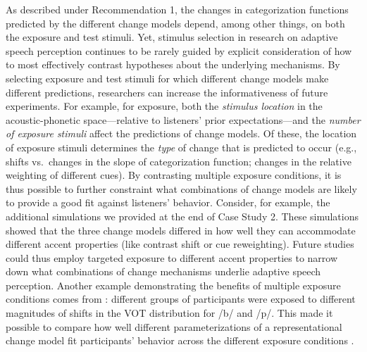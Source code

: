 \documentclass[
  11pt,
  man,floatsintext]{apa6}
\begin{document}
As described under Recommendation 1, the changes in categorization functions predicted by the different change models depend, among other things, on both the exposure and test stimuli. Yet, stimulus selection in research on adaptive speech perception continues to be rarely guided by explicit consideration of how to most effectively contrast hypotheses about the underlying mechanisms. By selecting exposure and test stimuli for which different change models make different predictions, researchers can increase the informativeness of future experiments. For example, for exposure, both the \emph{stimulus location} in the acoustic-phonetic space---relative to listeners' prior expectations---and the \emph{number of exposure stimuli} affect the predictions of change models. Of these, the location of exposure stimuli determines the \emph{type} of change that is predicted to occur (e.g., shifts vs.~changes in the slope of categorization function; changes in the relative weighting of different cues). By contrasting multiple exposure conditions, it is thus possible to further constraint what combinations of change models are likely to provide a good fit against listeners' behavior. Consider, for example, the additional simulations we provided at the end of Case Study 2. These simulations showed that the three change models differed in how well they can accommodate different accent properties (like contrast shift or cue reweighting). Future studies could thus employ targeted exposure to different accent properties to narrow down what combinations of change mechanisms underlie adaptive speech perception. Another example demonstrating the benefits of multiple exposure conditions comes from \textcite{kleinschmidt-jaeger2016cogsci}: different groups of participants were exposed to different magnitudes of shifts in the VOT distribution for /b/ and /p/. This made it possible to compare how well different parameterizations of a representational change model fit participants' behavior across the different exposure conditions \autocite[for additional analyses and discussion, see also][]{kleinschmidt2020}.
\end{document}
